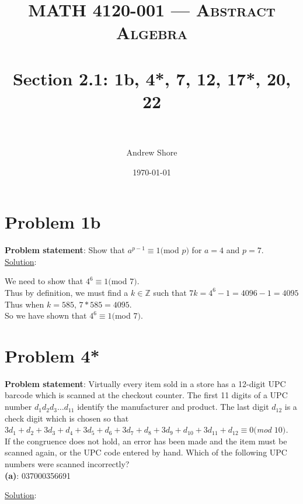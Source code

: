 \documentclass{article} %
\title{ 
\normalfont \normalsize 
\textsc{MATH 4120-001 --- Abstract Algebra} \\
\horrule{0.5pt} \\[0cm] %
\huge Section 2.1: 1b, 4*, 7, 12, 17*, 20, 22  \\ %
\horrule{2pt} \\[0cm] %
}
\author{Andrew Shore} %
\date{\normalsize\today} %
\begin{document}
\maketitle %

\section*{Problem 1b}


\textbf{Problem statement}: Show that $a^{p-1} \equiv 1 ($mod $p)$ for $a = 4$ and $p = 7$.
\\

\underline{Solution}: 
\begin{addmargin}[1em]{0em}
We need to show that $4^6 \equiv 1 ($mod $7)$.
\\Thus by definition, we must find a $k \in \mathbb{Z}$ such that $7k = 4^6 - 1 = 4096 - 1 = 4095$
\\Thus when $k = 585$, $7 * 585 = 4095$.
\\So we have shown that $4^6 \equiv 1($mod $7)$.
\end{addmargin}    

\newpage

\section*{Problem 4*}

\textbf{Problem statement}: Virtually every item sold in a store has a 12-digit UPC barcode which is scanned at the checkout counter.  The first 11 digits of a UPC number $d_1d_2d_3 \ldots d_{11}$ identify the manufacturer and product.  The last digit $d_{12}$ is a check digit which is chosen so that 
\\ \hfill \break
\textit{$3d_1 + d_2 + 3d_3 + d_4 + 3d_5 + d_6 + 3d_7 + d_8 + 3d_9 + d_{10} + 3d_{11} + d_{12} \equiv 0 ($mod $ 10)$.}
\\ \hfill \break
If the congruence does not hold, an error has been made and the item must be scanned again, or the UPC code entered by hand.  Which of the following UPC numbers were scanned incorrectly?
\\

\textbf{(a)}: 037000356691
\\
\begin{addmargin}[1em]{0em}
\underline{Solution}: 
\begin{addmargin}[1em]{0em}

\end{addmargin}
\begin{addmargin}[1em]{0em}
\end{addmargin}
\end{addmargin}
\end{document}
